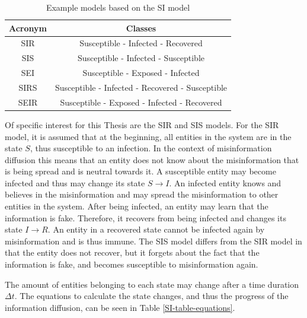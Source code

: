 \begin{table}[ht!]
    \centering
    \begin{tabular}{|c | c |} 
     \hline
     Acronym & Classes  \\ 
     \hline
     SIR & Susceptible - Infected - Recovered  \\ 
     \hline
     SIS & Susceptible - Infected - Susceptible \\
     \hline
     SEI & Susceptible - Exposed - Infected \\
     \hline
     SIRS & Susceptible - Infected - Recovered - Susceptible \\
     \hline
     SEIR & Susceptible - Exposed - Infected - Recovered \\
     \hline
    \end{tabular}
    \caption{Example models based on the SI 
    model  \cite{reviewinformationdiffusion}}
    \label{SI-table}
\end{table}

Of specific interest for this Thesis are the SIR and SIS models. 
For the SIR model, it is assumed that at the beginning, all entities in the 
system are in the state $S$, thus susceptible to an infection. In the context of 
misinformation diffusion this means that an entity does not know about the
misinformation that is being spread and is neutral towards it. A susceptible
entity may become infected and thus may change its state $S\to I$.
An infected entity knows and believes in the misinformation and may
spread the misinformation to other entities in the system. After being infected,
an entity may learn that the information is fake. Therefore, it recovers 
from being infected and changes its state $I\to R$. An entity in a 
recovered state cannot be infected again by misinformation and is thus immune.
The SIS model differs from the SIR model in that the entity does not recover,
but it \glqq forgets\grqq{} about the fact that the information is fake, 
and becomes susceptible to misinformation again.

The amount of entities belonging to each state may change 
after a time duration $\Delta t$. The equations to calculate the 
state changes, and thus the progress of the information diffusion, 
can be seen in Table \ref{SI-table-equations}.

